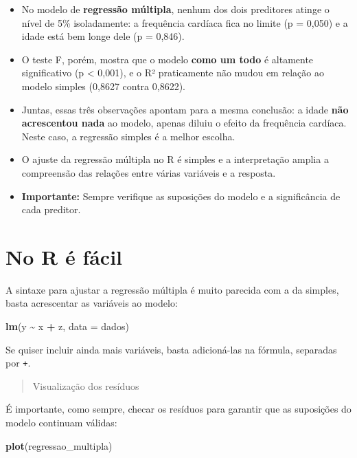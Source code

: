 \documentclass[
]{book}
\newenvironment{Shaded}{\begin{snugshade}}{\end{snugshade}}
\newcommand{\AttributeTok}[1]{\textcolor[rgb]{0.13,0.29,0.53}{#1}}
\newcommand{\FunctionTok}[1]{\textcolor[rgb]{0.13,0.29,0.53}{\textbf{#1}}}
\newcommand{\NormalTok}[1]{#1}
\newcommand{\SpecialCharTok}[1]{\textcolor[rgb]{0.81,0.36,0.00}{\textbf{#1}}}
\providecommand{\tightlist}{%
  \setlength{\itemsep}{0pt}\setlength{\parskip}{0pt}}
\begin{document}
\begin{itemize}
\tightlist
\item
  No modelo de \textbf{regressão múltipla}, nenhum dos dois preditores atinge o nível de 5\% isoladamente: a frequência cardíaca fica no limite (p = 0,050) e a idade está bem longe dele (p = 0,846).
\item
  O teste F, porém, mostra que o modelo \textbf{como um todo} é altamente significativo (p \textless{} 0,001), e o R² praticamente não mudou em relação ao modelo simples (0,8627 contra 0,8622).
\item
  Juntas, essas três observações apontam para a mesma conclusão: a idade \textbf{não acrescentou nada} ao modelo, apenas diluiu o efeito da frequência cardíaca. Neste caso, a regressão simples é a melhor escolha.
\item
  O ajuste da regressão múltipla no R é simples e a interpretação amplia a compreensão das relações entre várias variáveis e a resposta.\\
\item
  \textbf{Importante:} Sempre verifique as suposições do modelo e a significância de cada preditor.
\end{itemize}

\section{No R é fácil}\label{no-r-uxe9-fuxe1cil}

A sintaxe para ajustar a regressão múltipla é muito parecida com a da simples, basta acrescentar as variáveis ao modelo:

\begin{Shaded}
\begin{Highlighting}[]
\FunctionTok{lm}\NormalTok{(y }\SpecialCharTok{\textasciitilde{}}\NormalTok{ x }\SpecialCharTok{+}\NormalTok{ z, }\AttributeTok{data =}\NormalTok{ dados)}
\end{Highlighting}
\end{Shaded}

Se quiser incluir ainda mais variáveis, basta adicioná-las na fórmula, separadas por \texttt{+}.

\begin{quote}
Visualização dos resíduos
\end{quote}

É importante, como sempre, checar os resíduos para garantir que as suposições do modelo continuam válidas:

\begin{Shaded}
\begin{Highlighting}[]
\FunctionTok{plot}\NormalTok{(regressao\_multipla)}
\end{Highlighting}
\end{Shaded}
\end{document}
